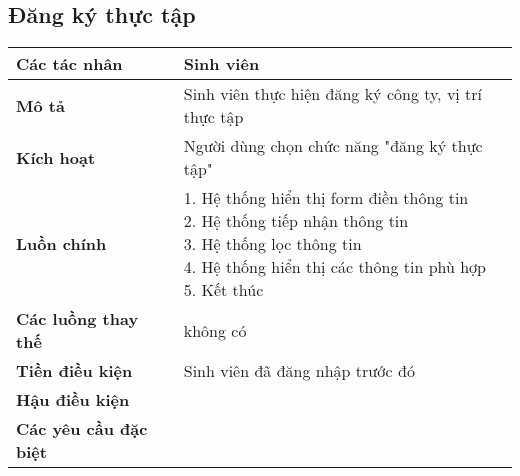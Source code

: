 \subsection{Đăng ký thực tập}
\begin{tabular}{|l|l|}
	\hline
	\textbf{Các tác nhân}         & Sinh viên                                             \\
	\hline
	\textbf{Mô tả}                & Sinh viên thực hiện đăng ký công ty, vị trí thực tập  \\
	\hline
	\textbf{Kích hoạt}            & Người dùng chọn chức năng "đăng ký thực tập"          \\
	\hline
	\textbf{Luồn chính}           & \makecell[l]{1. Hệ thống hiển thị form điền thông tin \\ 2. Hệ thống tiếp nhận thông tin \\ 3. Hệ thống lọc thông tin \\ 4. Hệ thống hiển thị các thông tin phù hợp \\ 5. Kết thúc} \\
	\hline
	\textbf{Các luồng thay thế}   & không có                                              \\
	\hline
	\textbf{Tiền điều kiện}       & Sinh viên đã đăng nhập trước đó                       \\
	\hline
	\textbf{Hậu điều kiện}        &                                                       \\
	\hline
	\textbf{Các yêu cầu đặc biệt} &                                                       \\
	\hline
\end{tabular}

